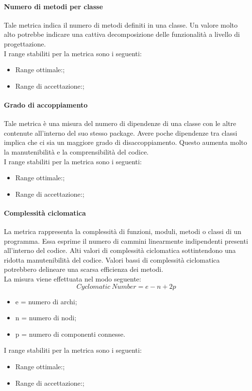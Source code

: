 			\paragraph{Numero di metodi per classe}
			Tale metrica indica il numero di metodi definiti in una classe. Un valore molto alto potrebbe indicare una cattiva decomposizione delle funzionalità a livello di progettazione. 
			\\I range stabiliti per la metrica sono i seguenti:
			\begin{itemize}
				\item Range ottimale:;
				\item Range di accettazione:;
			\end{itemize}
			
			\paragraph{Grado di accoppiamento}
			Tale metrica è una misura del numero di dipendenze di una classe con le altre contenute all'interno del suo stesso package. Avere poche dipendenze tra classi implica che ci sia un maggiore grado di disaccoppiamento. Questo aumenta molto la manutenibilità e la comprensibilità del codice.
			\\I range stabiliti per la metrica sono i seguenti:
			\begin{itemize}
				\item Range ottimale:;
				\item Range di accettazione:;
			\end{itemize}
			
			\paragraph{Complessità ciclomatica}
			La metrica rappresenta la complessità di funzioni, moduli, metodi o classi di un programma. Essa esprime il numero di cammini linearmente indipendenti presenti all'interno del codice. Alti valori di complessità ciclomatica sottintendono una ridotta manutenibilità del codice. Valori bassi di complessità ciclomatica potrebbero delineare una scarsa efficienza dei metodi.
			\\La misura viene effettuata nel modo seguente:
			\begin{equation}
			Cyclomatic \ Number = e - n + 2p
			\end{equation}
			\begin{itemize}
				\item e = numero di archi;
				\item n = numero di nodi;
				\item p = numero di componenti connesse.
		    \end{itemize}
			I range stabiliti per la metrica sono i seguenti:
			\begin{itemize}
				\item Range ottimale:;
				\item Range di accettazione:;
			\end{itemize}
			
